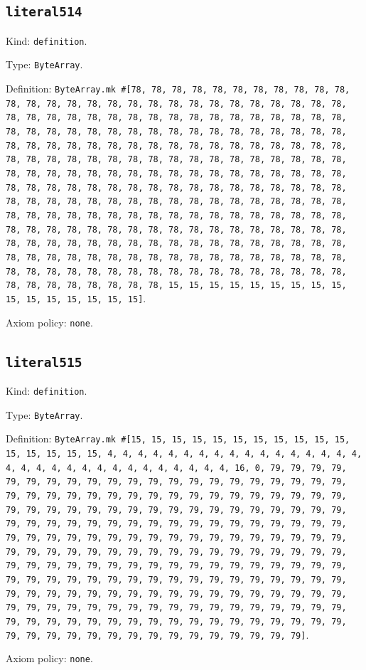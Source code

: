 \documentclass[11pt]{article}
\begin{document}
\subsection*{\texttt{literal514}}
\noindent Kind: \texttt{definition}.\par
\noindent Type: \texttt{ByteArray}.\par
\noindent Definition: \texttt{ByteArray.mk \#[78, 78, 78, 78, 78, 78, 78, 78, 78, 78, 78, 78, 78, 78, 78, 78, 78, 78, 78, 78, 78, 78, 78, 78, 78, 78, 78, 78, 78, 78, 78, 78, 78, 78, 78, 78, 78, 78, 78, 78, 78, 78, 78, 78, 78, 78, 78, 78, 78, 78, 78, 78, 78, 78, 78, 78, 78, 78, 78, 78, 78, 78, 78, 78, 78, 78, 78, 78, 78, 78, 78, 78, 78, 78, 78, 78, 78, 78, 78, 78, 78, 78, 78, 78, 78, 78, 78, 78, 78, 78, 78, 78, 78, 78, 78, 78, 78, 78, 78, 78, 78, 78, 78, 78, 78, 78, 78, 78, 78, 78, 78, 78, 78, 78, 78, 78, 78, 78, 78, 78, 78, 78, 78, 78, 78, 78, 78, 78, 78, 78, 78, 78, 78, 78, 78, 78, 78, 78, 78, 78, 78, 78, 78, 78, 78, 78, 78, 78, 78, 78, 78, 78, 78, 78, 78, 78, 78, 78, 78, 78, 78, 78, 78, 78, 78, 78, 78, 78, 78, 78, 78, 78, 78, 78, 78, 78, 78, 78, 78, 78, 78, 78, 78, 78, 78, 78, 78, 78, 78, 78, 78, 78, 78, 78, 78, 78, 78, 78, 78, 78, 78, 78, 78, 78, 78, 78, 78, 78, 78, 78, 78, 78, 78, 78, 78, 78, 78, 78, 78, 78, 78, 78, 78, 78, 78, 78, 78, 78, 78, 78, 78, 78, 78, 78, 78, 78, 78, 78, 78, 78, 15, 15, 15, 15, 15, 15, 15, 15, 15, 15, 15, 15, 15, 15, 15, 15]}.\par
\noindent Axiom policy: \texttt{none}.\par
\subsection*{\texttt{literal515}}
\noindent Kind: \texttt{definition}.\par
\noindent Type: \texttt{ByteArray}.\par
\noindent Definition: \texttt{ByteArray.mk \#[15, 15, 15, 15, 15, 15, 15, 15, 15, 15, 15, 15, 15, 15, 15, 15, 4, 4, 4, 4, 4, 4, 4, 4, 4, 4, 4, 4, 4, 4, 4, 4, 4, 4, 4, 4, 4, 4, 4, 4, 4, 4, 4, 4, 4, 4, 4, 4, 16, 0, 79, 79, 79, 79, 79, 79, 79, 79, 79, 79, 79, 79, 79, 79, 79, 79, 79, 79, 79, 79, 79, 79, 79, 79, 79, 79, 79, 79, 79, 79, 79, 79, 79, 79, 79, 79, 79, 79, 79, 79, 79, 79, 79, 79, 79, 79, 79, 79, 79, 79, 79, 79, 79, 79, 79, 79, 79, 79, 79, 79, 79, 79, 79, 79, 79, 79, 79, 79, 79, 79, 79, 79, 79, 79, 79, 79, 79, 79, 79, 79, 79, 79, 79, 79, 79, 79, 79, 79, 79, 79, 79, 79, 79, 79, 79, 79, 79, 79, 79, 79, 79, 79, 79, 79, 79, 79, 79, 79, 79, 79, 79, 79, 79, 79, 79, 79, 79, 79, 79, 79, 79, 79, 79, 79, 79, 79, 79, 79, 79, 79, 79, 79, 79, 79, 79, 79, 79, 79, 79, 79, 79, 79, 79, 79, 79, 79, 79, 79, 79, 79, 79, 79, 79, 79, 79, 79, 79, 79, 79, 79, 79, 79, 79, 79, 79, 79, 79, 79, 79, 79, 79, 79, 79, 79, 79, 79, 79, 79, 79, 79, 79, 79, 79, 79, 79, 79, 79, 79, 79, 79, 79, 79, 79, 79, 79, 79, 79, 79, 79, 79, 79, 79, 79, 79, 79, 79]}.\par
\noindent Axiom policy: \texttt{none}.\par
\end{document}
